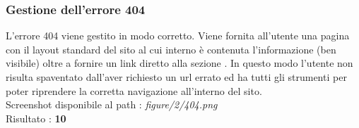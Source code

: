 \subsubsection{Gestione dell'errore 404}
L'errore 404 viene gestito in modo corretto.
Viene fornita all'utente una pagina con il layout standard del sito al cui
interno è contenuta l'informazione  (ben visibile) 
oltre a fornire un link diretto alla sezione 
. In questo modo l'utente non risulta
spaventato dall'aver richiesto un url errato ed ha tutti gli strumenti per poter
riprendere la corretta navigazione all'interno del sito. \\ 
Screenshot disponibile al path : \textit{figure/2/404.png} \\ 
Risultato : \textbf{10}
